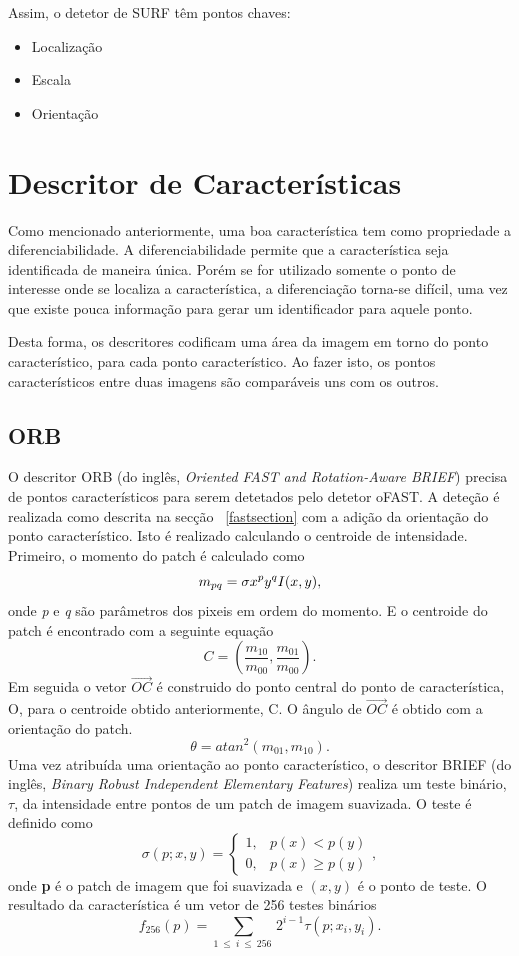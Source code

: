 Assim, o detetor de SURF têm pontos chaves:
\begin{itemize}
	\item Localização
	\item Escala
	\item Orientação
\end{itemize}


\section{Descritor de Características}

Como mencionado anteriormente, uma boa característica tem como propriedade a diferenciabilidade. A diferenciabilidade permite que a característica seja identificada de maneira única. Porém se for utilizado somente o ponto de interesse onde se localiza a característica, a diferenciação torna-se difícil, uma vez que existe pouca informação para gerar um identificador para aquele ponto.

Desta forma, os descritores codificam uma área da imagem em torno do ponto característico, para cada ponto característico. Ao fazer isto, os pontos característicos entre duas imagens são comparáveis uns com os outros.


\subsection{ORB}

O descritor ORB (do inglês, \textit{Oriented FAST and Rotation-Aware BRIEF}) precisa de pontos característicos para serem detetados pelo detetor oFAST. A deteção é realizada como descrita na secção ~\ref{fastsection} com a adição da orientação do ponto característico. Isto é realizado calculando o centroide de intensidade. Primeiro, o momento do patch é calculado como \[ \textit{$m_{pq}$} = \sigma \textit{$ x^py^qI$}(x,y) ,\]
onde \textit{p} e \textit{q} são parâmetros dos pixeis em ordem do momento. E o centroide do patch é encontrado com a seguinte equação \[ C = ( \frac{ \textit{m}_{10} }{ \textit{m}_{00}} ,  \frac{ \textit{m}_{01} }{ \textit{m}_{00}} ) . \]
Em seguida o vetor $\vec{OC}$ é construido do ponto central do ponto de característica, O, para o centroide obtido anteriormente, C. O ângulo de $\vec{OC}$ é obtido com a orientação do patch. \[ \theta = atan^2( \textit{m}_{01},\textit{m}_{10}) . \]
Uma vez atribuída uma orientação ao ponto característico, o descritor BRIEF (do inglês, \textit{Binary Robust Independent Elementary Features}) realiza um teste binário, $\tau$, da intensidade entre pontos de um patch de imagem suavizada. O teste é definido como  \[\sigma\left(p;x,y\right) = \left\{\begin{array}{cc}
1, & p(x)<p(y) \\ 
0, & p(x) \geq  p(y)   
\end{array}\right.
,\]
onde \textbf{p} é o patch de imagem que foi suavizada e \textbf{$(x,y)$} é o ponto de teste.
O resultado da característica é um vetor de 256 testes binários \[ f_{256} \left( p \right) = \sum_{1\ \le\ i\ \le\ 256\ } {2^{i-1}\tau\left(p;x_i,y_i\right) } . \]


